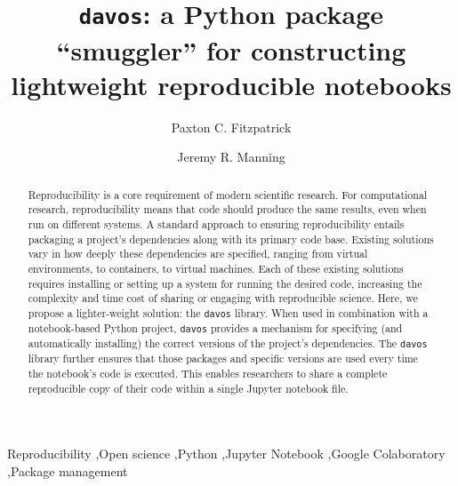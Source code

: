 \documentclass[preprint,12pt,a4paper]{elsarticle}
\begin{document}
\begin{frontmatter}

\title{\texttt{davos}: a Python package ``smuggler'' for constructing
  lightweight reproducible notebooks}
\author{Paxton C. Fitzpatrick}
\author{Jeremy R. Manning}
\address{Department of Psychological and Brain Sciences\\Dartmouth College, Hanover, NH 03755}


\begin{abstract}

  Reproducibility is a core requirement of modern scientific research.
  For computational research, reproducibility means that code should
  produce the same results, even when run on different systems.  A
  standard approach to ensuring reproducibility entails packaging a
  project's dependencies along with its primary code base.  Existing
  solutions vary in how deeply these dependencies are specified,
  ranging from virtual environments, to containers, to virtual
  machines.  Each of these existing solutions requires installing or
  setting up a system for running the desired code, increasing the
  complexity and time cost of sharing or engaging with reproducible
  science. Here, we propose a lighter-weight solution:  the
  \texttt{davos} library.  When used in combination with a
  notebook-based Python project, \texttt{davos} provides a
  mechanism for specifying (and automatically installing) the correct
  versions of the project's dependencies.  The \texttt{davos}
  library further ensures that those packages and specific versions are used every time the
  notebook's code is executed.  This enables researchers to share a complete
  reproducible copy of their code within a single Jupyter notebook file.

\end{abstract}


\begin{keyword}
Reproducibility \sep Open science \sep Python \sep Jupyter Notebook \sep Google Colaboratory \sep Package management
\end{keyword}

\end{frontmatter}
\end{document}
